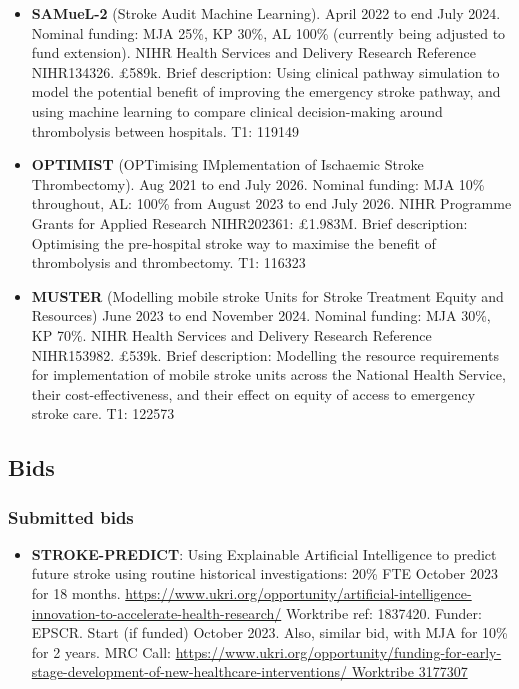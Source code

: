 \begin{itemize}
    \item \textbf{SAMueL-2} (Stroke Audit Machine Learning). April 2022 to end July 2024. Nominal funding: MJA 25\%, KP 30\%, AL 100\% (currently being adjusted to fund extension). NIHR Health Services and Delivery Research Reference NIHR134326. £589k. Brief description: Using clinical pathway simulation to model the potential benefit of improving the emergency stroke pathway, and using machine learning to compare clinical decision-making around thrombolysis between hospitals. T1: 119149
    \item \textbf{OPTIMIST} (OPTimising IMplementation of Ischaemic Stroke Thrombectomy). Aug 2021 to end July 2026. Nominal funding: MJA 10\% throughout, AL: 100\% from August 2023 to end July 2026. NIHR Programme Grants for Applied Research NIHR202361: £1.983M. Brief description: Optimising the pre-hospital stroke way to maximise the benefit of thrombolysis and thrombectomy. T1: 116323
    \item \textbf{MUSTER} (Modelling mobile stroke Units for Stroke Treatment Equity and Resources) June 2023 to end November 2024. Nominal funding: MJA 30\%, KP 70\%. NIHR Health Services and Delivery Research Reference NIHR153982. £539k. Brief description: Modelling the resource requirements for implementation of mobile stroke units across the National Health Service, their cost-effectiveness, and their effect on equity of access to emergency stroke care. T1: 122573
\end{itemize}

\subsection{Bids}

\subsubsection{Submitted bids}

\begin{itemize}
    \item \textbf{STROKE-PREDICT}: Using Explainable Artificial Intelligence to predict future stroke using routine historical investigations: 20\% FTE October 2023 for 18 months. \url{https://www.ukri.org/opportunity/artificial-intelligence-innovation-to-accelerate-health-research/} Worktribe ref: 1837420. Funder: EPSCR. Start (if funded) October 2023. Also, similar bid, with MJA for 10\% for 2 years. MRC Call:  \url{https://www.ukri.org/opportunity/funding-for-early-stage-development-of-new-healthcare-interventions/ Worktribe 3177307}
\end{itemize}

